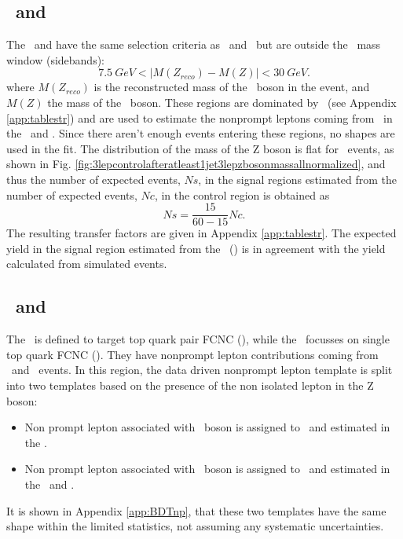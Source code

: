 \subsection{\TTCR\ and \STCR}
The \TTCR\ and \STCR have the same selection criteria as \TTSR\ and \STSR\, but are outside the \PZ\ mass window (sidebands): 
\begin{equation}
7.5 \: GeV < |M(Z_{reco}) - M(Z)| < 30 \:GeV. 
\end{equation}
where $M(Z_{reco})$ is the reconstructed mass of the \PZ\ boson in the event, and $M(Z)$ the mass of the \PZ\ boson.
These regions are dominated by \ttbar\ (see Appendix \ref{app:tablestr}) and are used to estimate the nonprompt  leptons coming from \ttbar\ in the \STSR\ and \TTSR. Since there aren't enough events entering these regions, no shapes are used in the fit. The distribution of the mass of the Z boson is flat for \ttbar\ events, as shown in Fig. \ref{fig:3lepcontrolafteratleast1jet3lepzbosonmassallnormalized},  and thus the number of expected events, $Ns$, in the signal regions estimated from the number of expected events, $Nc$, in the control region is obtained as
\begin{equation}
Ns = \frac{15}{60-15} Nc.
\end{equation}
The resulting transfer factors are given in Appendix \ref{app:tablestr}. The expected yield in the signal region estimated from the \TTCR\ (\STCR) is in agreement with the yield calculated from simulated events. 



\subsection{\TTSR\ and \STSR}
The \TTSR\ is defined to target top quark pair FCNC (\tZq), while the \STSR\ focusses on single top quark FCNC (\tZ). They have nonprompt  lepton contributions coming from \DY\ and \ttbar\ events. In this region, the data driven nonprompt  lepton template is split into two templates based on the presence of the non isolated lepton in the Z boson: 
\begin{itemize}
	\item Non prompt lepton associated with \PW\ boson is assigned to \DY\ and estimated in the \WZCR.
	\item Non prompt lepton associated with \PZ\ boson is assigned to \ttbar\ and estimated in the \TTCR\ and \STCR.
\end{itemize}
It is shown in Appendix \ref{app:BDTnp}, that these two templates have the same shape within the limited statistics, not assuming any systematic uncertainties. 

